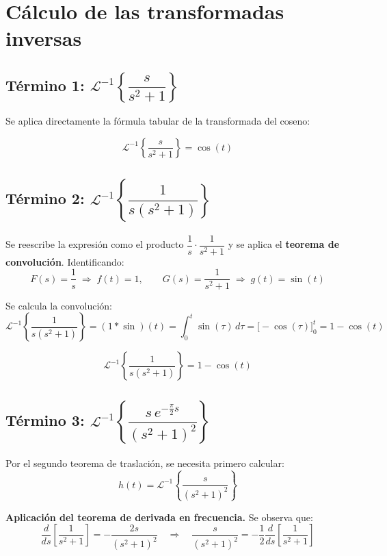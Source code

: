 \documentclass[12pt, a4paper]{article}
\newcommand{\Lap}{\mathcal{L}}
\newenvironment{resultado}{%
    \begin{tcolorbox}[resultstyle]%
}{%
    \end{tcolorbox}%
}
\begin{document}
\section{Cálculo de las transformadas inversas}

\subsection{Término 1: \texorpdfstring{$\Lap^{-1}\!\left\{\dfrac{s}{s^2+1}\right\}$}{}}

Se aplica directamente la fórmula tabular de la transformada del coseno:

\begin{resultado}
\[
    \Lap^{-1}\!\left\{\frac{s}{s^2+1}\right\} = \cos(t)
\]
\end{resultado}

\subsection{Término 2: \texorpdfstring{$\Lap^{-1}\!\left\{\dfrac{1}{s(s^2+1)}\right\}$}{}}

Se reescribe la expresión como el producto $\dfrac{1}{s}\cdot\dfrac{1}{s^2+1}$ y se aplica el \textbf{teorema de convolución}. Identificando:
\[
    F(s) = \frac{1}{s} \;\Longrightarrow\; f(t) = 1,
    \qquad
    G(s) = \frac{1}{s^2+1} \;\Longrightarrow\; g(t) = \sin(t)
\]

Se calcula la convolución:
\[
    \Lap^{-1}\!\left\{\frac{1}{s(s^2+1)}\right\}
    = (1 * \sin)(t)
    = \int_0^t \sin(\tau)\,d\tau
    = \bigl[-\cos(\tau)\bigr]_0^t
    = 1 - \cos(t)
\]

\begin{resultado}
\[
    \Lap^{-1}\!\left\{\frac{1}{s(s^2+1)}\right\} = 1 - \cos(t)
\]
\end{resultado}

\subsection{Término 3: \texorpdfstring{$\Lap^{-1}\!\left\{\dfrac{s\,e^{-\frac{\pi}{2}s}}{(s^2+1)^2}\right\}$}{}}

Por el segundo teorema de traslación, se necesita primero calcular:
\[
    h(t) = \Lap^{-1}\!\left\{\frac{s}{(s^2+1)^2}\right\}
\]

\textbf{Aplicación del teorema de derivada en frecuencia.} Se observa que:
\[
    \frac{d}{ds}\left[\frac{1}{s^2+1}\right] = -\frac{2s}{(s^2+1)^2}
    \quad \Longrightarrow \quad
    \frac{s}{(s^2+1)^2} = -\frac{1}{2}\frac{d}{ds}\left[\frac{1}{s^2+1}\right]
\]
\end{document}
